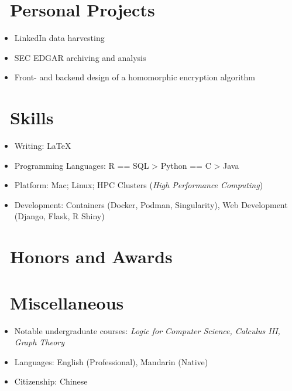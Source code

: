 \documentclass{resume}
\begin{document}

\section{\faUser\ Personal Projects}
\begin{itemize}[parsep=0.5ex]
  \item LinkedIn data harvesting
  \item SEC EDGAR archiving and analysis
  \item Front- and backend design of a homomorphic encryption algorithm
\end{itemize}


\section{\faCogs\ Skills}
\begin{itemize}[parsep=0.5ex]
  \item Writing: \LaTeX
  \item Programming Languages: R == SQL > Python == C > Java
  \item Platform: Mac; Linux; HPC Clusters (\emph{High Performance Computing}) 
  \item Development: Containers (Docker, Podman, Singularity), Web Development (Django, Flask, R Shiny)
\end{itemize}


\section{\faHeartO\ Honors and Awards}



\section{\faInfo\ Miscellaneous}
\begin{itemize}[parsep=0.5ex]
  \item Notable undergraduate courses:
      \textit{Logic for Computer Science, Calculus III, Graph Theory}
  \item Languages: English (Professional), Mandarin (Native)
  \item Citizenship: Chinese
\end{itemize}



\phantom{}
\end{document}

